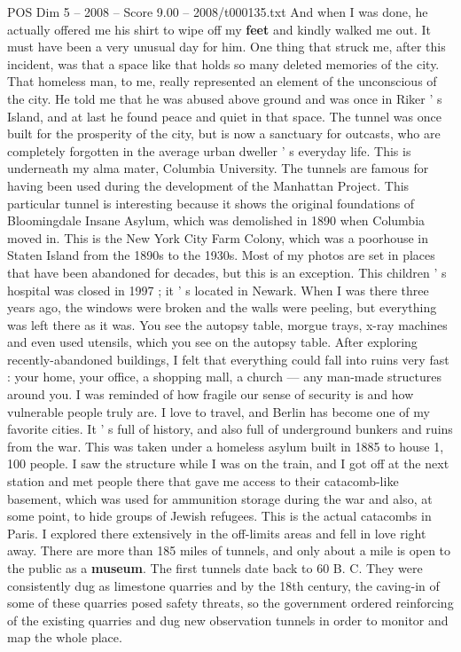\begin{textsample}{POS Dim 5 – 2008 – Score 9.00 – 2008/t000135.txt}
And when I was done, he actually offered me his shirt to wipe off my \textbf{feet} and kindly walked me out.
It must have been a very unusual day for him.
One thing that struck me, after this incident, was that a space like that holds so many deleted memories of the city.
That homeless man, to me, really represented an element of the unconscious of the city.
He told me that he was abused above ground and was once in Riker ' s Island, and at last he found peace and quiet in that space.
The tunnel was once built for the prosperity of the city, but is now a sanctuary for outcasts, who are completely forgotten in the average urban dweller ' s everyday life.
This is underneath my alma mater, Columbia University.
The tunnels are famous for having been used during the development of the Manhattan Project.
This particular tunnel is interesting because it shows the original foundations of Bloomingdale Insane Asylum, which was demolished in 1890 when Columbia moved in.
This is the New York City Farm Colony, which was a poorhouse in Staten Island from the 1890s to the 1930s.
Most of my photos are set in places that have been abandoned for decades, but this is an exception.
This children ' s hospital was closed in 1997 ; it ' s located in Newark.
When I was there three years ago, the windows were broken and the walls were peeling, but everything was left there as it was.
You see the autopsy table, morgue trays, x-ray machines and even used utensils, which you see on the autopsy table.
After exploring recently-abandoned buildings, I felt that everything could fall into ruins very fast : your home, your office, a shopping mall, a church — any man-made structures around you.
I was reminded of how fragile our sense of security is and how vulnerable people truly are.
I love to travel, and Berlin has become one of my favorite cities.
It ' s full of history, and also full of underground bunkers and ruins from the war.
This was taken under a homeless asylum built in 1885 to house 1, 100 people.
I saw the structure while I was on the train, and I got off at the next station and met people there that gave me access to their catacomb-like basement, which was used for ammunition storage during the war and also, at some point, to hide groups of Jewish refugees.
This is the actual catacombs in Paris.
I explored there extensively in the off-limits areas and fell in love right away.
There are more than 185 miles of tunnels, and only about a mile is open to the public as a \textbf{museum}.
The first tunnels date back to 60 B.
C.
They were consistently dug as limestone quarries and by the 18th century, the caving-in of some of these quarries posed safety threats, so the government ordered reinforcing of the existing quarries and dug new observation tunnels in order to monitor and map the whole place.

\end{textsample}
